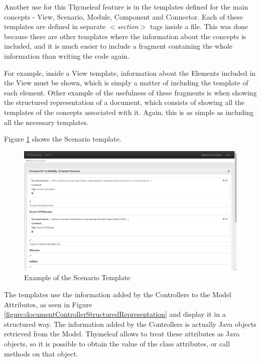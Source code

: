 Another use for this Thymeleaf feature is in the templates defined for the main concepts - View, Scenario, Module, Component and Connector. Each of these templates are defined in separate \textit{$<$section$>$} tags inside a file. This was done because there are other templates where the information about the concepts is included, and it is much easier to include a fragment containing the whole information than writing the code again. 

For example, inside a View template, information about the Elements included in the View must be shown, which is simply a matter of including the template of each element. Other example of the usefulness of these fragments is when showing the structured representation of a document, which consists of showing all the templates of the concepts associated with it. Again, this is as simple as including all the necessary templates.

Figure \ref{figure:viewScenarioTemplate} shows the Scenario template.
\begin{figure}[h]
\centering
\includegraphics[scale=0.3]{images/scenarioExample}
\caption{Example of the Scenario Template}
\label{figure:viewScenarioTemplate}
\end{figure}
The templates use the information added by the Controllers to the Model Attributes, as seen in Figure \ref{figure:documentControllerStructuredRepresentation} and display it in a structured way. The information added by the Controllers is actually Java objects retrieved from the Model. Thymeleaf allows to treat these attributes as Java objects, so it is possible to obtain the value of the class attributes, or call methods on that object. 

